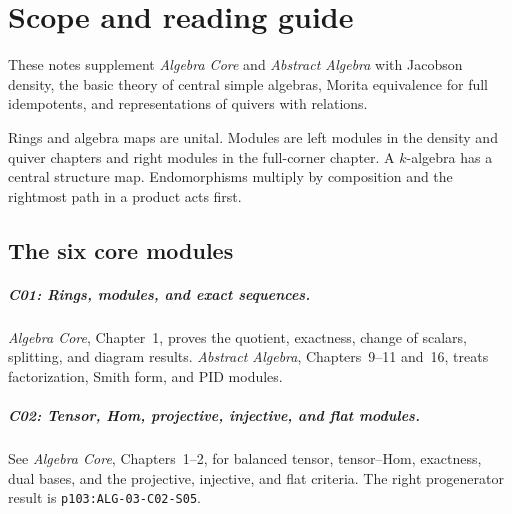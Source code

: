\chapter*{Scope and reading guide}

These notes supplement \emph{Algebra Core} and \emph{Abstract Algebra}
\cite{p103,d07} with Jacobson density, the basic theory of central simple
algebras, Morita equivalence for full idempotents, and representations
of quivers with relations.

Rings and algebra maps are unital. Modules are left modules in the
density and quiver chapters and right modules in the full-corner chapter.
A \(k\)-algebra has a central structure map. Endomorphisms multiply by
composition and the rightmost path in a product acts first.

{\setlength{\fboxsep}{0.8em}\setlength{\fboxrule}{0.35pt}%
\noindent{}\par}

\section*{The six core modules}

\paragraph{C01: Rings, modules, and exact sequences.}
\emph{Algebra Core}, Chapter~1, proves the quotient, exactness, change
of scalars, splitting, and diagram results. \emph{Abstract Algebra},
Chapters~9--11 and~16, treats factorization, Smith form, and PID modules.

\paragraph{C02: Tensor, Hom, projective, injective, and flat modules.}
See \emph{Algebra Core}, Chapters~1--2, for balanced tensor, tensor--Hom,
exactness, dual bases, and the projective, injective, and flat criteria.
The right progenerator result is \texttt{p103:ALG-03-C02-S05}.


